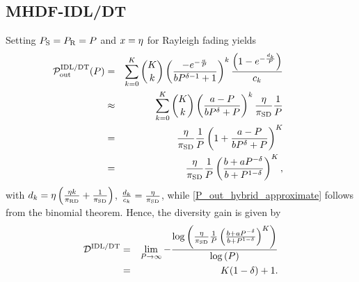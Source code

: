 \documentclass[10pt,journal]{IEEEtran}
\begin{document}
\subsection{MHDF-IDL/DT}
%
Setting $P_{{\rm S}}=P_{{\rm R}}=P$ and $x=\eta$ for Rayleigh fading yields
\begin{eqnarray}
\!\!\!\!\!\!\!\!\!\!\!\!\!\!\!\!\PMHDT(\Pgen)
&=&\sum_{k=0}^K {K \choose k} \left(\frac{-e^{-\frac{a}{\Pgen}}}{b \Pgen^{\PWRSCL-1}+1}\right)^k \frac{\left(1-e^{-\frac{d_k}{\Pgen}}\right)}{c_k}\nonumber\\
&\approx&\sum_{k=0}^K {K \choose k} \left(\frac{a-\Pgen}{b\Pgen^{\PWRSCL}+\Pgen}\right)^k \frac{\SNRFD}{\pisd}\frac{1}{\Pgen}\nonumber\\
&=&\frac{\SNRFD}{\pisd}\frac{1}{\Pgen} \left(1+\frac{a-\Pgen}{b\Pgen^{\PWRSCL}+\Pgen}\right)^K\label{P_out_hybrid_approximate}\nonumber\\
&=& \frac{\SNRFD}{\pisd}\frac{1}{\Pgen} \left(\frac{b+a\Pgen^{-\PWRSCL}}{b+\Pgen^{1-\PWRSCL}}\right)^K,
\end{eqnarray}
with $d_k=\eta \left(\frac{\eta k}{{\pi_{{\rm R} {\rm D}}}}+\frac{1}{{\pi_{{\rm S} {\rm D}}}}\right)$, $\frac{d_k}{c_k}=\frac{\eta}{{\pi_{{\rm S} {\rm D}}}}$, while \eqref{P_out_hybrid_approximate} follows from the binomial theorem. Hence, the diversity gain is given by
\begin{eqnarray}
\mathcal{D}^{\text{IDL/DT}}
&=&\lim_{P\rightarrow \infty} -\frac{\log\left(\frac{\eta}{{\pi_{{\rm S} {\rm D}}}}\frac{1}{P} \left(\frac{b+aP^{-\delta}}{b+P^{1-\delta}}\right)^K\right)}{\log\left(P\right)}\nonumber\\
&=& K(1-\delta)+1.\label{diversity_IDLDT}
\end{eqnarray}
%
\end{document}
